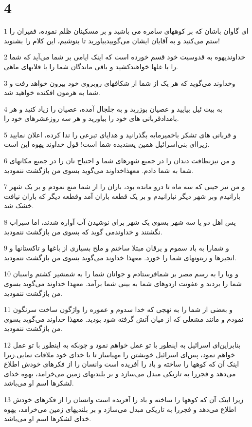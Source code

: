 \chapter{4}

\par 1 ای گاوان باشان که بر کوههای سامره می باشید و بر مسکینان ظلم نموده، فقیران را ستم می‌کنید و به آقایان ایشان می‌گوییدبیاورید تا بنوشیم، این کلام را بشنوید!
\par 2 خداوندیهوه به قدوسیت خود قسم خورده است که اینک ایامی بر شما می‌آید که شما را با غلها خواهندکشید و باقی ماندگان شما را با قلابهای ماهی.
\par 3 وخداوند می‌گوید که هر یک از شما از شکافهای روبروی خود بیرون خواهد رفت و شما به هرمون افکنده خواهید شد.
\par 4 به بیت ئیل بیایید و عصیان بوزرید و به جلجال آمده، عصیان را زیاد کنید و هر بامدادقربانی های خود را بیاورید و هر سه روزعشرهای خود را.
\par 5 و قربانی های تشکر باخمیرمایه بگذرانید و هدایای تبرعی را ندا کرده، اعلان نمایید زیرا‌ای بنی‌اسرائیل همین پسندیده شما است! قول خداوند یهوه این است.
\par 6 و من نیزنظافت دندان را در جمیع شهرهای شما و احتیاج نان را در جمیع مکانهای شما به شما دادم. معهذاخداوند می‌گوید بسوی من بازگشت ننمودید.
\par 7 و من نیز حینی که سه ماه تا درو مانده بود، باران را از شما منع نمودم و بر یک شهر بارانیدم وبر شهر دیگر نبارانیدم و بر یک قطعه باران آمد وقطعه دیگر که باران نیافت خشک شد.
\par 8 پس اهل دو یا سه شهر بسوی یک شهر برای نوشیدن آب آواره شدند، اما سیراب نگشتند و خداوندمی گوید که بسوی من بازگشت ننمودید.
\par 9 و شمارا به باد سموم و یرقان مبتلا ساختم و ملخ بسیاری از باغها و تاکستانها و انجیرها و زیتونهای شما را خورد. معهذا خداوند می‌گوید بسوی من بازگشت ننمودید.
\par 10 و وبا را به رسم مصر بر شمافرستادم و جوانان شما را به شمشیر کشتم واسبان شما را بردند و عفونت اردوهای شما به بینی شما برآمد. معهذا خداوند می‌گوید بسوی من بازگشت ننمودید.
\par 11 و بعضی از شما را به نهجی که خدا سدوم و عموره را واژگون ساخت سرنگون نمودم و مانند مشعلی که از میان آتش گرفته شود بودید. معهذا خداوند می‌گوید بسوی من بازگشت ننمودید.
\par 12 بنابراین‌ای اسرائیل به اینطور با تو عمل خواهم نمود و چونکه به اینطور با تو عمل خواهم نمود، پس‌ای اسرائیل خویشتن را مهیاساز تا با خدای خود ملاقات نمایی.زیرا اینک آن که کوهها را ساخته و باد را آفریده است وانسان را از فکرهای خودش اطلاع می‌دهد و فجررا به تاریکی مبدل می‌سازد و بر بلندیهای زمین می‌خرامد، یهوه خدای لشکرها اسم او می‌باشد.
\par 13 زیرا اینک آن که کوهها را ساخته و باد را آفریده است وانسان را از فکرهای خودش اطلاع می‌دهد و فجررا به تاریکی مبدل می‌سازد و بر بلندیهای زمین می‌خرامد، یهوه خدای لشکرها اسم او می‌باشد.

